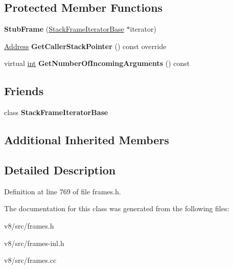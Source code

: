 \subsection*{Protected Member Functions}
\begin{DoxyCompactItemize}
\item 
\mbox{\label{classv8_1_1internal_1_1StubFrame_af20ec1c34864746407ce4748856a4d66}} 
{\bfseries Stub\+Frame} (\mbox{\hyperlink{classv8_1_1internal_1_1StackFrameIteratorBase}{Stack\+Frame\+Iterator\+Base}} $\ast$iterator)
\item 
\mbox{\label{classv8_1_1internal_1_1StubFrame_ac410e216c440f5646893dcdd80902685}} 
\mbox{\hyperlink{classuintptr__t}{Address}} {\bfseries Get\+Caller\+Stack\+Pointer} () const override
\item 
\mbox{\label{classv8_1_1internal_1_1StubFrame_a009934978ce61c9f4a120561048f7468}} 
virtual \mbox{\hyperlink{classint}{int}} {\bfseries Get\+Number\+Of\+Incoming\+Arguments} () const
\end{DoxyCompactItemize}
\subsection*{Friends}
\begin{DoxyCompactItemize}
\item 
\mbox{\label{classv8_1_1internal_1_1StubFrame_ac7310421866976ca454bbe11c5f926c3}} 
class {\bfseries Stack\+Frame\+Iterator\+Base}
\end{DoxyCompactItemize}
\subsection*{Additional Inherited Members}


\subsection{Detailed Description}


Definition at line 769 of file frames.\+h.



The documentation for this class was generated from the following files\+:\begin{DoxyCompactItemize}
\item 
v8/src/frames.\+h\item 
v8/src/frames-\/inl.\+h\item 
v8/src/frames.\+cc\end{DoxyCompactItemize}
